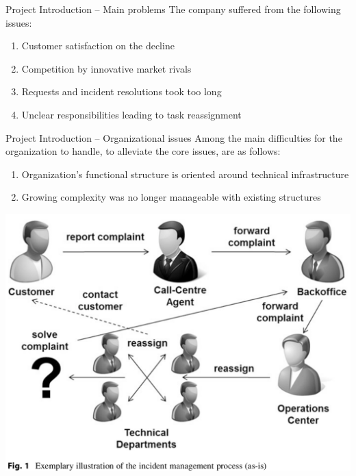 \documentclass{beamer}
\begin{document}
\begin{frame}{Project Introduction -- Main problems}
    The company suffered from the following issues:
    \begin{enumerate}[$\circ$]
        \item Customer satisfaction on the decline
        \item Competition by innovative market rivals
        \item Requests and incident resolutions took too long
        \item Unclear responsibilities leading to task reassignment
    \end{enumerate}
\end{frame}

\begin{frame}{Project Introduction -- Organizational issues}
    Among the main difficulties for the organization to handle, to alleviate the core issues, are as follows:
    \begin{enumerate}[$\circ$]
        \item Organization's functional structure is oriented around technical infrastructure
        \item Growing complexity was no longer manageable with existing structures
    \end{enumerate}
\end{frame}

\begin{frame}
    \begin{center}
        \includegraphics[width=1.0\textwidth]{proj_incidentmgmt.png}
    \end{center}
\end{frame}
\end{document}
